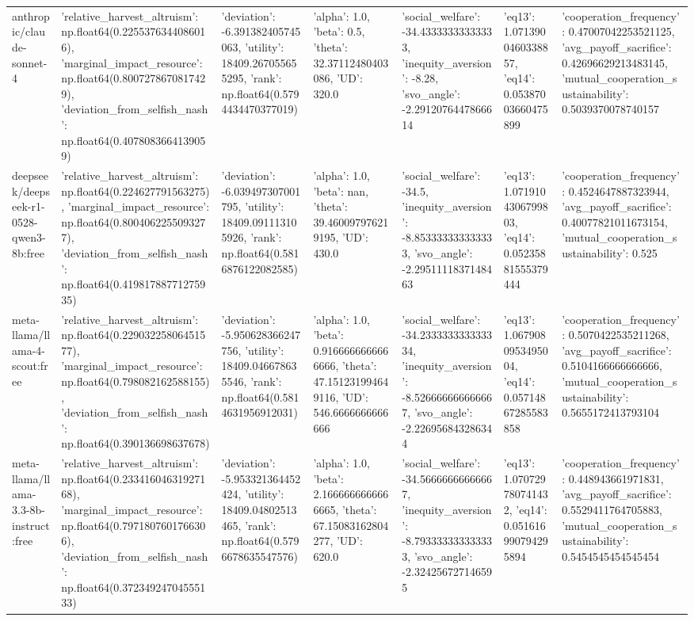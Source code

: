 \begin{table}
\begin{tabular}{lllllll}
anthropic/claude-sonnet-4 & {'relative_harvest_altruism': np.float64(0.2255376344086016), 'marginal_impact_resource': np.float64(0.8007278670817429), 'deviation_from_selfish_nash': np.float64(0.4078083664139059)} & {'deviation': -6.391382405745063, 'utility': 18409.267055655295, 'rank': np.float64(0.5794434470377019)} & {'alpha': 1.0, 'beta': 0.5, 'theta': 32.37112480403086, 'UD': 320.0} & {'social_welfare': -34.43333333333333, 'inequity_aversion': -8.28, 'svo_angle': -2.2912076447866614} & {'eq13': 1.0713900460338857, 'eq14': 0.05387003660475899} & {'cooperation_frequency': 0.47007042253521125, 'avg_payoff_sacrifice': 0.42696629213483145, 'mutual_cooperation_sustainability': 0.5039370078740157} \\
deepseek/deepseek-r1-0528-qwen3-8b:free & {'relative_harvest_altruism': np.float64(0.224627791563275), 'marginal_impact_resource': np.float64(0.8004062255093277), 'deviation_from_selfish_nash': np.float64(0.41981788771275935)} & {'deviation': -6.039497307001795, 'utility': 18409.091113105926, 'rank': np.float64(0.5816876122082585)} & {'alpha': 1.0, 'beta': nan, 'theta': 39.460097976219195, 'UD': 430.0} & {'social_welfare': -34.5, 'inequity_aversion': -8.853333333333333, 'svo_angle': -2.2951111837148463} & {'eq13': 1.0719104306799803, 'eq14': 0.05235881555379444} & {'cooperation_frequency': 0.4524647887323944, 'avg_payoff_sacrifice': 0.40077821011673154, 'mutual_cooperation_sustainability': 0.525} \\
meta-llama/llama-4-scout:free & {'relative_harvest_altruism': np.float64(0.22903225806451577), 'marginal_impact_resource': np.float64(0.798082162588155), 'deviation_from_selfish_nash': np.float64(0.390136698637678)} & {'deviation': -5.950628366247756, 'utility': 18409.046678635546, 'rank': np.float64(0.5814631956912031)} & {'alpha': 1.0, 'beta': 0.9166666666666666, 'theta': 47.151231994649116, 'UD': 546.6666666666666} & {'social_welfare': -34.233333333333334, 'inequity_aversion': -8.526666666666667, 'svo_angle': -2.226956843286344} & {'eq13': 1.0679080953495004, 'eq14': 0.05714867285583858} & {'cooperation_frequency': 0.5070422535211268, 'avg_payoff_sacrifice': 0.5104166666666666, 'mutual_cooperation_sustainability': 0.5655172413793104} \\
meta-llama/llama-3.3-8b-instruct:free & {'relative_harvest_altruism': np.float64(0.23341604631927168), 'marginal_impact_resource': np.float64(0.7971807601766306), 'deviation_from_selfish_nash': np.float64(0.37234924704555133)} & {'deviation': -5.953321364452424, 'utility': 18409.04802513465, 'rank': np.float64(0.5796678635547576)} & {'alpha': 1.0, 'beta': 2.1666666666666665, 'theta': 67.15083162804277, 'UD': 620.0} & {'social_welfare': -34.56666666666667, 'inequity_aversion': -8.793333333333333, 'svo_angle': -2.324256727146595} & {'eq13': 1.070729780741432, 'eq14': 0.051616990794295894} & {'cooperation_frequency': 0.448943661971831, 'avg_payoff_sacrifice': 0.5529411764705883, 'mutual_cooperation_sustainability': 0.5454545454545454} \\

\end{tabular}
\end{table}
